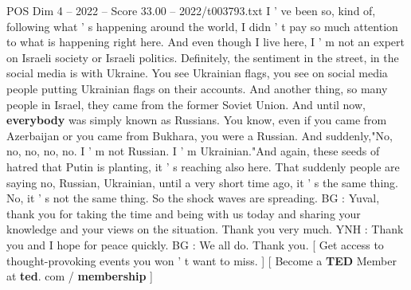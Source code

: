 \begin{textsample}{POS Dim 4 – 2022 – Score 33.00 – 2022/t003793.txt}
I ' ve been so, kind of, following what ' s happening around the world, I didn ' t pay so much attention to what is happening right here.
And even though I live here, I ' m not an expert on Israeli society or Israeli politics.
Definitely, the sentiment in the street, in the social media is with Ukraine.
You see Ukrainian flags, you see on social media people putting Ukrainian flags on their accounts.
And another thing, so many people in Israel, they came from the former Soviet Union.
And until now, \textbf{everybody} was simply known as Russians.
You know, even if you came from Azerbaijan or you came from Bukhara, you were a Russian.
And suddenly,"No, no, no, no, no.
I ' m not Russian.
I ' m Ukrainian."And again, these seeds of hatred that Putin is planting, it ' s reaching also here.
That suddenly people are saying no, Russian, Ukrainian, until a very short time ago, it ' s the same thing.
No, it ' s not the same thing.
So the shock waves are spreading.
BG : Yuval, thank you for taking the time and being with us today and sharing your knowledge and your views on the situation.
Thank you very much.
YNH : Thank you and I hope for peace quickly.
BG : We all do.
Thank you. [ Get access to thought-provoking events you won ' t want to miss. ] [ Become a \textbf{TED} Member at \textbf{ted}. com / \textbf{membership} ]

\end{textsample}
